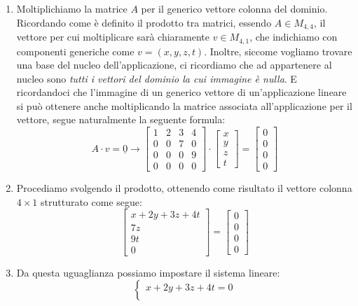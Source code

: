 \documentclass[12pt]{report}
\newcommand{\nullvector}{\underline{0}}
\begin{document}
	\begin{enumerate}
		\item Moltiplichiamo la matrice $A$ per il generico vettore colonna del dominio. Ricordando come è definito il prodotto tra matrici, essendo $A \in M_{4, 4}$, il vettore per cui moltiplicare sarà chiaramente $v \in M_{4,1}$, che indichiamo con componenti generiche come $v = (x, y, z, t)$. Inoltre, siccome vogliamo trovare una base del nucleo dell'applicazione, ci ricordiamo che ad appartenere al nucleo sono \textit{tutti i vettori del dominio la cui immagine è nulla}. E ricordandoci che l'immagine di un generico vettore di un'applicazione lineare si può ottenere anche moltiplicando la matrice associata all'applicazione per il vettore, segue naturalmente la seguente formula:
		\[
			A \cdot v = \nullvector \to 
			\begin{bmatrix}
				1 & 2 & 3 & 4\\
				0 & 0 & 7 & 0\\
				0 & 0 & 0 & 9\\
				0 & 0 & 0 & 0
			\end{bmatrix} \cdot 
			\begin{bmatrix}
				x\\
				y\\
				z\\
				t
			\end{bmatrix} = 
			\begin{bmatrix}
				0\\
				0\\
				0\\
				0
			\end{bmatrix}
		\]
		\item Procediamo svolgendo il prodotto, ottenendo come risultato il vettore colonna $4 \times 1$ strutturato come segue:
		\[
			\begin{bmatrix}
				x + 2y + 3z + 4t\\
				7z\\
				9t\\
				0
			\end{bmatrix} = 
			\begin{bmatrix}
				0\\
				0\\
				0\\
				0
			\end{bmatrix}
		\]
		\item Da questa uguaglianza possiamo impostare il sistema lineare:
		\[
			\begin{cases}
				x+2y+3z+4t = 0\\

\end{cases}\]
\end{enumerate}
\end{document}
